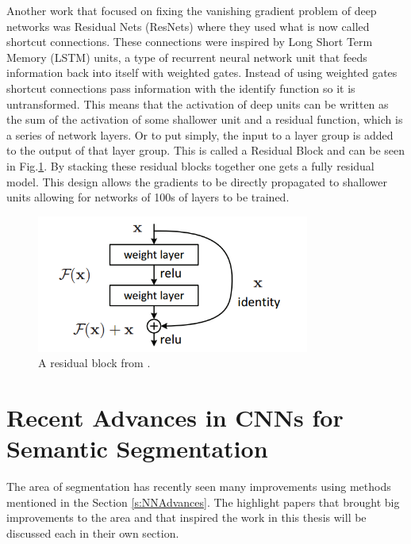 Another work that focused on fixing the vanishing gradient problem of deep networks was Residual Nets (ResNets) \cite{he2015deep} where they used what is now called shortcut connections. These connections were inspired by Long Short Term Memory (LSTM) units, a type of recurrent neural network unit that feeds information back into itself with weighted gates. Instead of using weighted gates shortcut connections pass information with the identify function so it is untransformed. This means that the activation of deep units can be written as the sum of the activation of some shallower unit and a residual function, which is a series of network layers. Or to put simply, the input to a layer group is added to the output of that layer group. This is called a Residual Block and can be seen in Fig.\ref{f:resblock}. By stacking these residual blocks together one gets a fully residual model. This design allows the gradients to be directly propagated to shallower units allowing for networks of 100s of layers to be trained. 
\begin{figure}[h!]
	\centering
		\includegraphics[width=0.80\textwidth]{figures/resblock.png}
	\caption{A residual block from \cite{he2015deep}.}
	\label{f:resblock}
\end{figure}


\section{Recent Advances in CNNs for Semantic Segmentation}\label{s:RecentAdvsCNNs}
The area of segmentation has recently seen many improvements using methods mentioned in the Section \ref{s:NNAdvances}. The highlight papers that brought big improvements to the area and that inspired the work in this thesis will be discussed each in their own section.

